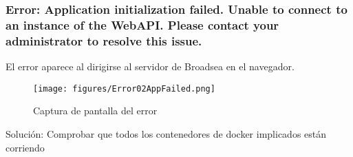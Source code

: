 \subsubsection{Error: Application initialization failed. Unable to connect to an instance of the WebAPI. Please contact your administrator to resolve this issue.}

El error aparece al dirigirse al servidor de Broadsea en el navegador.

\begin{figure}[H]
    \centering
    \texttt{[image: figures/Error02AppFailed.png]}
     \caption{Captura de pantalla del error}
    \label{fig:Error02AppFailed}
\end{figure}

Solución: Comprobar que todos los contenedores de docker implicados están corriendo


